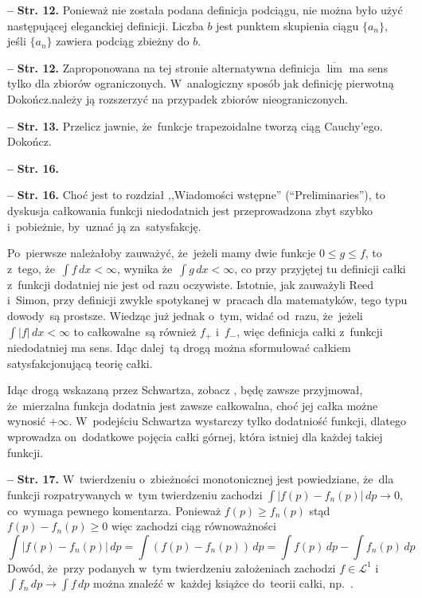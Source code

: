 \documentclass[a4paper,11pt]{article}
\newcommand{\ol}{\overline}
\newcommand{\mc}{\mathcal}
\newcommand{\ra}{\rightarrow}
\newcommand{\Lc}{\mc{L}}
\newcommand{\Limsup}{\ol{\lim}}
\newcommand{\dk}{\, d} %
\newcommand{\Int}{\int\limits}
\newcommand{\IntCaD}[2] { \Int #1 \, d#2 } %
\newcommand{\LIj}{\Lc^{ 1 }}
\providecommand{\absj}[1]{\lvert #1 \rvert}
\newcommand{\tb}{\textbf}
\newcommand{\noi}{\noindent}
\newcommand{\start}{\noi \tb{--} {}}
\newcommand{\Str}[1]{\tb{Str. #1.}}
\newcommand{\Dok}{{\color{red} Dokończ.}}
\begin{document}
\start \Str{12} Ponieważ nie została podana definicja podciągu, nie
można było użyć następującej eleganckiej definicji. Liczba $b$ jest
punktem skupienia ciągu $\{ a_{ n } \}$, jeśli $\{ a_{ n } \}$ zawiera
podciąg zbieżny do $b$.

\start \Str{12} Zaproponowana na tej stronie alternatywna definicja
$\Limsup$ ma sens tylko dla zbiorów ograniczonych. W~analogiczny
sposób jak definicję pierwotną \Dok należy ją rozszerzyć na przypadek
zbiorów nieograniczonych.

\start \Str{13} Przelicz jawnie, że~funkcje trapezoidalne tworzą ciąg
Cauchy'ego. \Dok

\start \Str{16}

\start \Str{16} Choć jest to rozdział ,,Wiadomości wstępne''
(``Preliminaries''), to dyskusja całkowania funkcji niedodatnich jest
przeprowadzona zbyt szybko i~pobieżnie, by~uznać ją za~satysfakcję.

Po~pierwsze należałoby zauważyć, że~jeżeli mamy dwie funkcje
$0 \leq g \leq f$, to z~tego, że~$\IntCaD{ f }{ x } < \infty$, wynika
że~$\IntCaD{ g }{ x } < \infty$, co przy przyjętej tu definicji całki
z~funkcji dodatniej nie jest od razu oczywiste. Istotnie, jak
zauważyli Reed i~Simon, przy definicji zwykle spotykanej w~pracach dla
matematyków, tego typu dowody~są prostsze. Wiedząc już jednak o~tym,
widać od~razu, że~jeżeli $\IntCaD{ \absj{ f } }{ x } < \infty$ to
całkowalne~są również $f_{ + }$ i~$f_{ - }$, więc definicja całki
z~funkcji niedodatniej ma sens. Idąc dalej~tą drogą można sformułować
całkiem satysfakcjonującą teorię całki.

Idąc drogą wskazaną przez Schwartza, zobacz \cite{Schwartz79}, będę
zawsze przyjmował, że~mierzalna funkcja dodatnia jest zawsze
całkowalna, choć jej całka możne wynosić $+\infty$. W~podejściu
Schwartza wystarczy tylko dodatniość funkcji, dlatego wprowadza
on~dodatkowe pojęcia całki górnej, która istniej dla każdej takiej
funkcji.


\start \Str{17} W~twierdzeniu o~zbieżności monotonicznej jest
powiedziane, że~dla funkcji rozpatrywanych w~tym twierdzeniu zachodzi
$\int | f( p ) - f_{ n }( p ) | \dk p \ra 0$, co~wymaga pewnego
komentarza. Ponieważ $f( p ) \geq f_{ n }( p )$ stąd
$f( p ) - f_{ n }( p ) \geq 0$ więc zachodzi ciąg równoważności
\begin{displaymath}
  \IntCaD{ | f( p ) - f_{ n }( p ) | }{ p } = \IntCaD{ ( f( p )
    - f_{ n }( p ) ) }{ p } = \IntCaD{ f( p ) }{ p }
  - \IntCaD{ f_{ n }( p ) }{ p }
\end{displaymath}
Dowód, że~przy podanych w~tym twierdzeniu założeniach zachodzi
$f \in \LIj$ i~$\IntCaD{ f_{ n } }{ p } \ra \IntCaD{ f }{ p }$ można
znaleźć w~każdej książce do~teorii całki, np.~\cite{Rudin98}.
\end{document}
